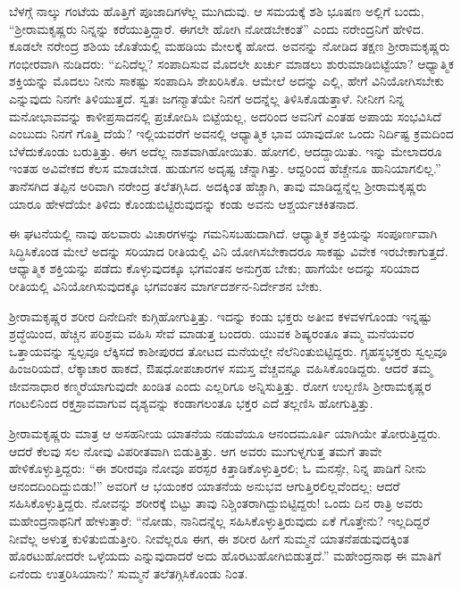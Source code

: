 ಬೆಳಗ್ಗೆ ನಾಲ್ಕು ಗಂಟೆಯ ಹೊತ್ತಿಗೆ ಪೂಜಾದಿಗಳೆಲ್ಲ ಮುಗಿದುವು. ಆ ಸಮಯಕ್ಕೆ ಶಶಿ ಭೂಷಣ ಅಲ್ಲಿಗೆ ಬಂದು, “ಶ್ರೀರಾಮಕೃಷ್ಣರು ನಿನ್ನನ್ನು ಕರೆಯುತ್ತಿದ್ದಾರೆ. ಈಗಲೇ ಹೋಗಿ ನೋಡಬೇಕಂತೆ” ಎಂದು ನರೇಂದ್ರನಿಗೆ ಹೇಳಿದ. ಕೂಡಲೇ ನರೇಂದ್ರ ಶಶಿಯ ಜೊತೆಯಲ್ಲಿ ಮಹಡಿಯ ಮೇಲಕ್ಕೆ ಹೋದ. ಅವನನ್ನು ನೋಡಿದ ತಕ್ಷಣ ಶ್ರೀರಾಮಕೃಷ್ಣರು ಗಂಭೀರವಾಗಿ ನುಡಿದರು: “ಏನಿದೆಲ್ಲ? ಸಂಪಾದಿಸುವ ಮೊದಲೇ ಖರ್ಚು ಮಾಡಲು ಶುರುಮಾಡಿಬಿಟ್ಟೆಯಾ? ಆಧ್ಯಾತ್ಮಿಕ ಶಕ್ತಿಯನ್ನು ಮೊದಲು ನೀನು ಸಾಕಷ್ಟು ಸಂಪಾದಿಸಿ ಶೇಖರಿಸಿಕೊ. ಆಮೇಲೆ ಅದನ್ನು ಎಲ್ಲಿ, ಹೇಗೆ ವಿನಿಯೋಗಿಸಬೇಕು ಎನ್ನುವುದು ನಿನಗೇ ತಿಳಿಯುತ್ತದೆ. ಸ್ವತಃ ಜಗನ್ಮಾತೆಯೇ ನಿನಗೆ ಅದನ್ನೆಲ್ಲ ತಿಳಿಸಿಕೊಡುತ್ತಾಳೆ. ನೀನೀಗ ನಿನ್ನ ಮನೋಭಾವವನ್ನು ಕಾಳೀಪ್ರಸಾದನಲ್ಲಿ ಪ್ರಚೋದಿಸಿ ಬಿಟ್ಟೆಯಲ್ಲ, ಅದರಿಂದ ಅವನಿಗೆ ಎಂತಹ ಅಪಾಯ ಸಂಭವಿಸಿದೆ ಎಂಬುದು ನಿನಗೆ ಗೊತ್ತಿ ದೆಯೆ? ಇಲ್ಲಿಯವರೆಗೆ ಅವನಲ್ಲಿ ಆಧ್ಯಾತ್ಮಿಕ ಭಾವ ಯಾವುದೋ ಒಂದು ನಿರ್ದಿಷ್ಟ ಕ್ರಮದಿಂದ ಬೆಳೆದುಕೊಂಡು ಬರುತ್ತಿತ್ತು. ಈಗ ಅದೆಲ್ಲ ನಾಶವಾಗಿಹೋಯಿತು. ಹೋಗಲಿ, ಆದದ್ದಾಯಿತು. ಇನ್ನು ಮೇಲಾದರೂ ಇಂತಹ ಅವಿವೇಕದ ಕೆಲಸ ಮಾಡಬೇಡ. ಹುಡುಗನ ಅದೃಷ್ಟ ಚೆನ್ನಾಗಿತ್ತು. ಆದ್ದರಿಂದ ಹೆಚ್ಚೇನೂ ಹಾನಿಯಾಗಲಿಲ್ಲ.” ತಾನೆಸಗಿದ ತಪ್ಪಿನ ಅರಿವಾಗಿ ನರೇಂದ್ರ ತಲೆತಗ್ಗಿಸಿದ. ಅದಕ್ಕಿಂತ ಹೆಚ್ಚಾಗಿ, ತಾವು ಮಾಡಿದ್ದನ್ನೆಲ್ಲ ಶ್ರೀರಾಮಕೃಷ್ಣರು ಯಾರೂ ಹೇಳದೆಯೇ ತಿಳಿದು ಕೊಂಡುಬಿಟ್ಟಿರುವುದನ್ನು ಕಂಡು ಅವನು ಆಶ್ಚರ್ಯಚಕಿತನಾದ.

ಈ ಘಟನೆಯಲ್ಲಿ ನಾವು ಹಲವಾರು ವಿಚಾರಗಳನ್ನು ಗಮನಿಸಬಹುದಾಗಿದೆ. ಆಧ್ಯಾತ್ಮಿಕ ಶಕ್ತಿಯನ್ನು ಸಂಪೂರ್ಣವಾಗಿ ಸಿದ್ಧಿಸಿಕೊಂಡ ಮೇಲೆ ಅದನ್ನು ಸರಿಯಾದ ರೀತಿಯಲ್ಲಿ ವಿನಿ ಯೋಗಿಸಬೇಕಾದರೂ ಸಾಕಷ್ಟು ವಿವೇಕ ಇರಬೇಕಾಗುತ್ತದೆ. ಆಧ್ಯಾತ್ಮಿಕ ಶಕ್ತಿಯನ್ನು ಪಡೆದು ಕೊಳ್ಳುವುದಕ್ಕೂ ಭಗವಂತನ ಅನುಗ್ರಹ ಬೇಕು; ಹಾಗೆಯೇ ಅದನ್ನು ಸರಿಯಾದ ರೀತಿಯಲ್ಲಿ ವಿನಿಯೋಗಿಸುವುದಕ್ಕೂ ಭಗವಂತನ ಮಾರ್ಗದರ್ಶನ-ನಿರ್ದೇಶನ ಬೇಕು.

\delimiter

ಶ್ರೀರಾಮಕೃಷ್ಣರ ಶರೀರ ದಿನೇದಿನೇ ಕುಗ್ಗಿಹೋಗುತ್ತಿತ್ತು. ಇದನ್ನು ಕಂಡು ಭಕ್ತರು ಅತೀವ ಕಳವಳಗೊಂಡು ಇನ್ನಷ್ಟು ಶ್ರದ್ಧೆಯಿಂದ, ಹೆಚ್ಚಿನ ಪರಿಶ್ರಮ ವಹಿಸಿ ಸೇವೆ ಮಾಡುತ್ತ ಬಂದರು. ಯುವಕ ಶಿಷ್ಯರಂತೂ ತಮ್ಮ ಮನೆಯವರ ಒತ್ತಾಯವನ್ನು ಸ್ವಲ್ಪವೂ ಲೆಕ್ಕಿಸದೆ ಕಾಶೀಪುರದ ತೋಟದ ಮನೆಯಲ್ಲೇ ನೆಲೆನಿಂತುಬಿಟ್ಟಿದ್ದರು. ಗೃಹಸ್ಥಭಕ್ತರು ಸ್ವಲ್ಪವೂ ಹಿಂಜರಿಯದೆ, ಲೆಕ್ಕಾಚಾರ ಹಾಕದೆ, ಔಷಧೋಪಚಾರಗಳ ಸಮಸ್ತ ವೆಚ್ಚವನ್ನೂ ವಹಿಸಿಕೊಂಡಿದ್ದರು. ಆದರೆ ತಮ್ಮ ಜೀವನಾಧಾರ ಕಣ್ಮರೆಯಾಗುವುದೇ ಖಂಡಿತ ಎಂದು ಎಲ್ಲರಿಗೂ ಅನ್ನಿಸುತ್ತಿತ್ತು. ರೋಗ ಉಲ್ಬಣಿಸಿ ಶ್ರೀರಾಮಕೃಷ್ಣರ ಗಂಟಲಿನಿಂದ ರಕ್ತಸ್ರಾವವಾಗುವ ದೃಶ್ಯವನ್ನು ಕಂಡಾಗಲಂತೂ ಭಕ್ತರ ಎದೆ ತಲ್ಲಣಿಸಿ ಹೋಗುತ್ತಿತ್ತು.

ಶ್ರೀರಾಮಕೃಷ್ಣರು ಮಾತ್ರ ಆ ಅಸಹನೀಯ ಯಾತನೆಯ ನಡುವೆಯೂ ಆನಂದಮೂರ್ತಿ ಯಾಗಿಯೇ ತೋರುತ್ತಿದ್ದರು. ಆದರೆ ಕೆಲವು ಸಲ ನೋವು ವಿಪರೀತವಾಗಿ ಬಿಡುತ್ತಿತ್ತು. ಆಗ ಅವರು ಮುಗುಳ್ನಗುತ್ತ ತಮಗೆ ತಾವೇ ಹೇಳಿಕೊಳ್ಳುತ್ತಿದ್ದರು: “ಈ ಶರೀರವೂ ನೋವೂ ಪರಸ್ಪರ ಕಿತ್ತಾಡಿಕೊಳ್ಳುತ್ತಿರಲಿ; ಓ ಮನಸ್ಸೇ, ನಿನ್ನ ಪಾಡಿಗೆ ನೀನು ಆನಂದದಿಂದಿದ್ದುಬಿಡು!” ಅವರಿಗೆ ಆ ಭಯಂಕರ ಯಾತನೆಯ ಅನುಭವ ಆಗುತ್ತಿರಲಿಲ್ಲವೆಂದಲ್ಲ; ಆದರೆ ಸಹಿಸಿಕೊಳ್ಳುತ್ತಿದ್ದರು. ನೋವನ್ನು ಶರೀರಕ್ಕೆ ಬಿಟ್ಟು ತಾವು ನಿಶ್ಚಿಂತರಾಗಿದ್ದುಬಿಟ್ಟಿದ್ದರು! ಒಂದು ದಿನ ರಾತ್ರಿ ಅವರು ಮಹೇಂದ್ರನಾಥನಿಗೆ ಹೇಳುತ್ತಾರೆ: “ನೋಡು, ನಾನಿದನ್ನೆಲ್ಲ ಸಹಿಸಿಕೊಳ್ಳುತ್ತಿರುವುದು ಏಕೆ ಗೊತ್ತೇನು? ಇಲ್ಲದಿದ್ದರೆ ನೀವೆಲ್ಲ ಅಳುತ್ತ ಕುಳಿತುಬಿಡುತ್ತೀರಿ. ನೀವೆಲ್ಲರೂ ಈಗ, ಈ ಶರೀರ ಹೀಗೆ ಸುಮ್ಮನೆ ಯಾತನೆಪಡುವುದಕ್ಕಿಂತ ಹೊರಟುಹೋದರೇ ಒಳ್ಳೆಯದು ಎನ್ನುವುದಾದರೆ ಅದು ಹೊರಟುಹೋಗಿಬಿಡುತ್ತದೆ.” ಮಹೇಂದ್ರನಾಥ ಈ ಮಾತಿಗೆ ಏನೆಂದು ಉತ್ತರಿಸಿಯಾನು? ಸುಮ್ಮನೆ ತಲೆತಗ್ಗಿಸಿಕೊಂಡು ನಿಂತ.


